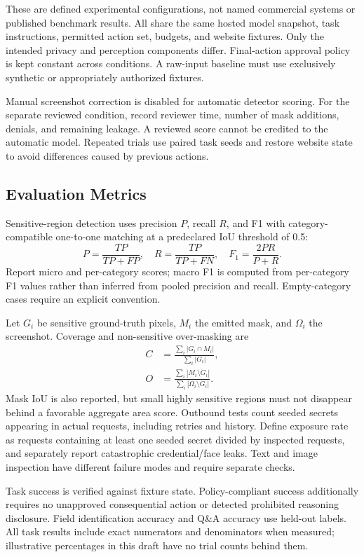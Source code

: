 \documentclass[conference]{IEEEtran}
\begin{document}
These are defined experimental configurations, not named commercial systems or published benchmark results. All share the same hosted model snapshot, task instructions, permitted action set, budgets, and website fixtures. Only the intended privacy and perception components differ. Final-action approval policy is kept constant across conditions. A raw-input baseline must use exclusively synthetic or appropriately authorized fixtures.

Manual screenshot correction is disabled for automatic detector scoring. For the separate reviewed condition, record reviewer time, number of mask additions, denials, and remaining leakage. A reviewed score cannot be credited to the automatic model. Repeated trials use paired task seeds and restore website state to avoid differences caused by previous actions.

\subsection{Evaluation Metrics}
Sensitive-region detection uses precision $P$, recall $R$, and F1 with category-compatible one-to-one matching at a predeclared IoU threshold of 0.5:
\begin{equation}
 P=\frac{TP}{TP+FP},\quad R=\frac{TP}{TP+FN},\quad F_1=\frac{2PR}{P+R}.
\end{equation}
Report micro and per-category scores; macro F1 is computed from per-category F1 values rather than inferred from pooled precision and recall. Empty-category cases require an explicit convention.

Let $G_i$ be sensitive ground-truth pixels, $M_i$ the emitted mask, and $\Omega_i$ the screenshot. Coverage and non-sensitive over-masking are
\begin{align}
 C&=\frac{\sum_i|G_i\cap M_i|}{\sum_i|G_i|},\\
 O&=\frac{\sum_i|M_i\setminus G_i|}{\sum_i|\Omega_i\setminus G_i|}.
\end{align}
Mask IoU is also reported, but small highly sensitive regions must not disappear behind a favorable aggregate area score. Outbound tests count seeded secrets appearing in actual requests, including retries and history. Define exposure rate as requests containing at least one seeded secret divided by inspected requests, and separately report catastrophic credential/face leaks. Text and image inspection have different failure modes and require separate checks.

Task success is verified against fixture state. Policy-compliant success additionally requires no unapproved consequential action or detected prohibited reasoning disclosure. Field identification accuracy and Q\&A accuracy use held-out labels. All task results include exact numerators and denominators when measured; illustrative percentages in this draft have no trial counts behind them.
\end{document}
